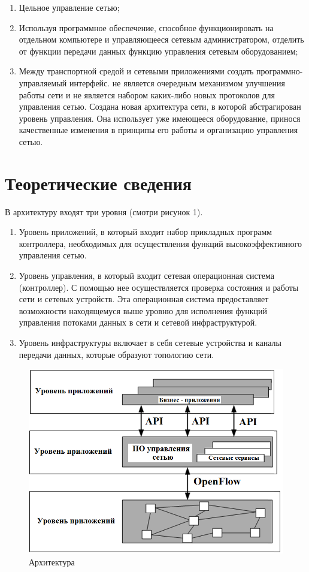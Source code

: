 \documentclass[bachelor, och, coursework]{SCWorks}
\begin{document}
\begin{enumerate}
\item Цельное управление сетью;
\item Используя программное обеспечение, способное функционировать на отдельном компьютере и управляющееся сетевым администратором, отделить от функции передачи данных функцию управления сетевым оборудованием;
\item Между транспортной средой и сетевыми приложениями создать программно-управляемый интерфейс.
 не является очередным механизмом улучшения работы сети и не является набором каких-либо новых протоколов для управления сетью. Создана новая архитектура сети, в которой абстрагирован уровень управления. Она использует уже имеющееся оборудование, принося качественные изменения в принципы его работы и организацию управления сетью.
\end{enumerate}


\section{Теоретические сведения}\label{theory}
В архитектуру  входят три уровня (смотри рисунок 1).
\begin{enumerate}
\item Уровень приложений, в который входит набор прикладных программ контроллера, необходимых для осуществления функций высокоэффективного управления сетью.
\item Уровень управления, в который входит сетевая операционная система (контроллер). С помощью нее осуществляется проверка состояния и работы сети и сетевых устройств. Эта операционная система предоставляет возможности находящемуся выше уровню для исполнения функций управления потоками данных в сети и сетевой инфраструктурой.
\item Уровень инфраструктуры включает в себя сетевые устройства и каналы передачи данных, которые образуют топологию сети.
\end{enumerate}
\begin{figure}[H]
    \centering
    \includegraphics[width=\textwidth]{pic1}
    \caption{Архитектура }\label{fig:fact-02}
\end{figure}
\end{document}
